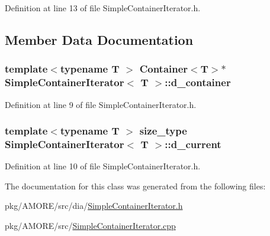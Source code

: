 Definition at line 13 of file SimpleContainerIterator.h.



\subsection{Member Data Documentation}
\hypertarget{class_simple_container_iterator_a179c3b6ee590cd5476d6dee1c7b9a90e}{
\subsubsection[{d\_\-container}]{\setlength{\rightskip}{0pt plus 5cm}template$<$typename T $>$ {\bf Container}$<$T$>$$\ast$ {\bf SimpleContainerIterator}$<$ T $>$::{\bf d\_\-container}}}
\label{class_simple_container_iterator_a179c3b6ee590cd5476d6dee1c7b9a90e}


Definition at line 9 of file SimpleContainerIterator.h.

\hypertarget{class_simple_container_iterator_a0e03fa66760ef1cb70ed2a357299605f}{
\subsubsection[{d\_\-current}]{\setlength{\rightskip}{0pt plus 5cm}template$<$typename T $>$ size\_\-type {\bf SimpleContainerIterator}$<$ T $>$::{\bf d\_\-current}}}
\label{class_simple_container_iterator_a0e03fa66760ef1cb70ed2a357299605f}


Definition at line 10 of file SimpleContainerIterator.h.



The documentation for this class was generated from the following files:\begin{DoxyCompactItemize}
\item 
pkg/AMORE/src/dia/\hyperlink{_simple_container_iterator_8h}{SimpleContainerIterator.h}\item 
pkg/AMORE/src/\hyperlink{_simple_container_iterator_8cpp}{SimpleContainerIterator.cpp}\end{DoxyCompactItemize}

